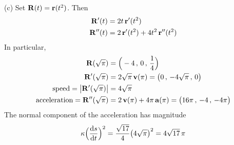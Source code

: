 \begin{solution}
	(c) Set $\mathbf{R}(t) = \mathbf{r}(t^2)$. Then 
	\begin{align*}
	\mathbf{R}'(t)&=2t\,\mathbf{r}'(t^2)  \\
	\mathbf{R}''(t) &= 2\,\mathbf{r}'(t^2) +4t^2\,\mathbf{r}''(t^2) 
	\end{align*}
	In particular,
	\begin{align*}
	\mathbf{R}(\sqrt{\pi}) &= \Big(-4\,,\, 0\,,\,  \frac{1}{4}\Big) \\
	\mathbf{R}'(\sqrt{\pi}) &= 2\sqrt{\pi}\,\mathbf{v}(\pi)
	=\big(0\,,\, -4\sqrt{\pi}\,,\, 0\big) \\
	\text{speed} = \big|\mathbf{R}'(\sqrt{\pi})\big| &=4\sqrt{\pi} \\
	\text{acceleration}=\mathbf{R}''(\sqrt{\pi})
	&= 2\,\mathbf{v}(\pi)+4\pi\,\mathbf{a}(\pi)
	= \big( 16\pi\,,\, -4\,,\, -4\pi\big) 
	\end{align*}
	The normal component of the acceleration has magnitude
	\begin{align*}
	\ka\Big(\diff{s}{t}\Big)^2 = \frac{\sqrt{17}}{4}\big(4\sqrt{\pi}\big)^2
	=4\sqrt{17}\,\pi
	\end{align*}
\end{solution}